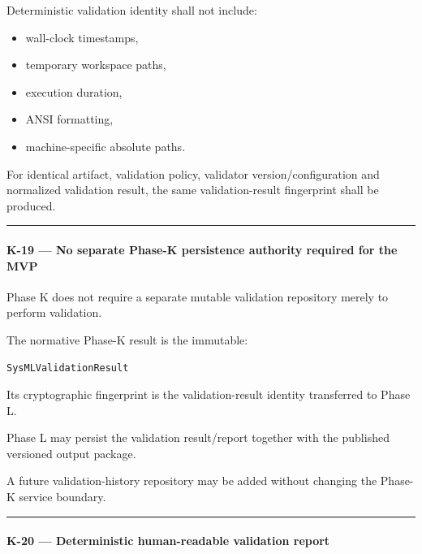 Deterministic validation identity shall not include:

\begin{itemize}
\tightlist
\item
  wall-clock timestamps,
\item
  temporary workspace paths,
\item
  execution duration,
\item
  ANSI formatting,
\item
  machine-specific absolute paths.
\end{itemize}

For identical artifact, validation policy, validator version/configuration and normalized validation result, the same validation-result fingerprint shall be produced.

\begin{center}\rule{0.5\linewidth}{0.5pt}\end{center}

\hypertarget{k-19--no-separate-phase-k-persistence-authority-required-for-the-mvp}{%
\paragraph{K-19 --- No separate Phase-K persistence authority required for the MVP}\label{k-19--no-separate-phase-k-persistence-authority-required-for-the-mvp}}

Phase K does not require a separate mutable validation repository merely to perform validation.

The normative Phase-K result is the immutable:

\begin{verbatim}
SysMLValidationResult
\end{verbatim}

Its cryptographic fingerprint is the validation-result identity transferred to Phase L.

Phase L may persist the validation result/report together with the published versioned output package.

A future validation-history repository may be added without changing the Phase-K service boundary.

\begin{center}\rule{0.5\linewidth}{0.5pt}\end{center}

\hypertarget{k-20--deterministic-human-readable-validation-report}{%
\paragraph{K-20 --- Deterministic human-readable validation report}\label{k-20--deterministic-human-readable-validation-report}}

